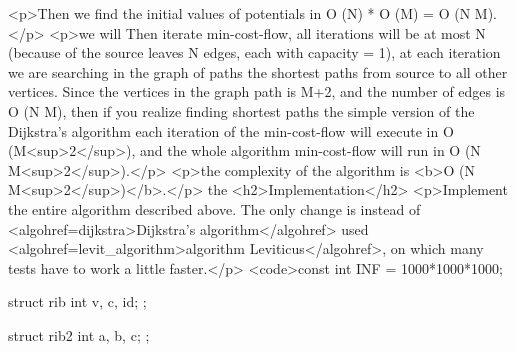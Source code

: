 <p>Then we find the initial values of potentials in O (N) * O (M) = O (N M).</p>
<p>we will Then iterate min-cost-flow, all iterations will be at most N (because of the source leaves N edges, each with capacity = 1), at each iteration we are searching in the graph of paths the shortest paths from source to all other vertices. Since the vertices in the graph path is M+2, and the number of edges is O (N M), then if you realize finding shortest paths the simple version of the Dijkstra's algorithm each iteration of the min-cost-flow will execute in O (M<sup>2</sup>), and the whole algorithm min-cost-flow will run in O (N M<sup>2</sup>).</p>
<p>the complexity of the algorithm is <b>O (N M<sup>2</sup>)</b>.</p>
the <h2>Implementation</h2>
<p>Implement the entire algorithm described above. The only change is instead of <algohref=dijkstra>Dijkstra's algorithm</algohref> used <algohref=levit_algorithm>algorithm Leviticus</algohref>, on which many tests have to work a little faster.</p>
<code>const int INF = 1000*1000*1000;

struct rib {
int v, c, id;
};

struct rib2 {
int a, b, c;
};

